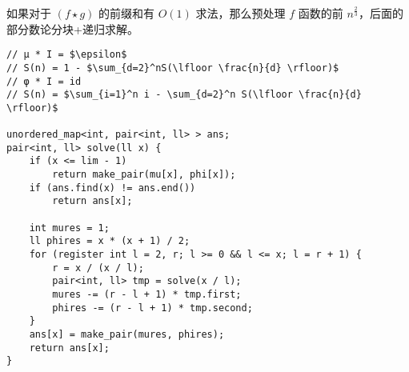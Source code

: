 如果对于 $(f \star g)$ 的前缀和有 $O(1)$ 求法，那么预处理 $f$ 函数的前 $n^{\frac{2}{3}}$，后面的部分数论分块+递归求解。
\begin{verbatim}
// μ * I = $\epsilon$
// S(n) = 1 - $\sum_{d=2}^nS(\lfloor \frac{n}{d} \rfloor)$
// φ * I = id
// S(n) = $\sum_{i=1}^n i - \sum_{d=2}^n S(\lfloor \frac{n}{d} \rfloor)$ 

unordered_map<int, pair<int, ll> > ans;
pair<int, ll> solve(ll x) {
    if (x <= lim - 1)
        return make_pair(mu[x], phi[x]);
    if (ans.find(x) != ans.end())
        return ans[x];
        
    int mures = 1;
    ll phires = x * (x + 1) / 2;
    for (register int l = 2, r; l >= 0 && l <= x; l = r + 1) {
        r = x / (x / l);
        pair<int, ll> tmp = solve(x / l);
        mures -= (r - l + 1) * tmp.first;
        phires -= (r - l + 1) * tmp.second;
    }
    ans[x] = make_pair(mures, phires);
    return ans[x];
}
\end{verbatim}
